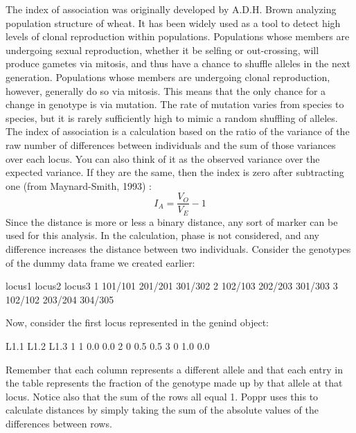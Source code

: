 \documentclass[letterpaper]{article}
\newcommand{\beq}{\begin{equation}}
\newcommand{\eeq}{\end{equation}}
\newcommand{\tab}{\hspace*{1em}}
\begin{document}
\tab \tab The index of association was originally developed by A.D.H. Brown analyzing population structure of wheat. \cite{Brown:1980} It has been widely used as a tool to detect high levels of clonal reproduction within populations. \cite{Smith:1993} Populations whose members are undergoing sexual reproduction, whether it be selfing or out-crossing, will produce gametes via mitosis, and thus have a chance to shuffle alleles in the next generation. Populations whose members are undergoing clonal reproduction, however, generally do so via mitosis. This means that the only chance for a change in genotype is via mutation. The rate of mutation varies from species to species, but it is rarely sufficiently high to mimic a random shuffling of alleles. The index of association is a calculation based on the ratio of the variance of the raw number of differences between individuals and the sum of those variances over each locus. \cite{Smith:1993} You can also think of it as the observed variance over the expected variance. If they  are the same, then the index is zero after subtracting one (from Maynard-Smith, 1993) \cite{Smith:1993}:
\beq
I_A = \frac{V_O}{V_E}-1
\eeq
Since the distance is more or less a binary distance, any sort of marker can be used for this analysis. In the calculation, phase is not considered, and any difference increases the distance between two individuals. Consider the genotypes of the dummy data frame we created earlier:
\begin{Schunk}
\begin{Soutput}
   locus1  locus2  locus3
1 101/101 201/201 301/302
2 102/103 202/203 301/303
3 102/102 203/204 304/305
\end{Soutput}
\end{Schunk}
Now, consider the first locus represented in the genind object:
\begin{Schunk}
\begin{Soutput}
  L1.1 L1.2 L1.3
1    1  0.0  0.0
2    0  0.5  0.5
3    0  1.0  0.0
\end{Soutput}
\end{Schunk}
Remember that each column represents a different allele and that each entry in the table represents the fraction of the genotype made up by that allele at that locus. Notice also that the sum of the rows all equal 1. Poppr uses this to calculate distances by simply taking the sum of the absolute values of the differences between rows.
\end{document}
